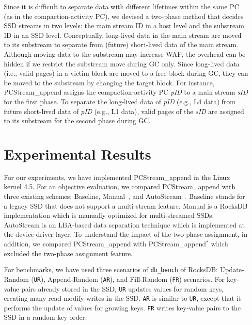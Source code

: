 Since it is difficult to separate data with different lifetimes within the same PC 
(as in the compaction-activity PC), we devised a two-phase method that decides SSD 
streams in two levels: the main stream ID in a host level and the substream ID in an SSD level.
Conceptually, long-lived data in the main stream are moved to its substream to 
separate from (future) short-lived data of the main stream.
Although moving data to the substream may increase WAF,
the overhead can be hidden if we restrict the substream move during GC only.
Since long-lived data (i.e., valid pages) in a victim block are moved to a free block during GC, 
they can be moved to the substream by changing the target block.
For instance, \textsf{\small PCStream\_append} assigns the compaction-activity PC {\it pID} to a
main stream {\it sID} for the first phase.
To separate the long-lived data of {\it pID} (e.g., L4 data) 
from future short-lived data of {\it pID} (e.g., L1 data), 
valid pages of the {\it sID} are assigned to its substream for the second phase during GC.


\section{Experimental Results}

For our experiments, we have implemented \textsf{\small PCStream\_append} in the Linux kernel
4.5.  For an objective evaluation, we compared \textsf{\small PCStream\_append} with three
existing schemes: \textsf{\small Baseline}, \textsf{\small Manual}~\cite{MultiStream}, and
\textsf{\small AutoStream}~\cite{AutoStream}.  \textsf{\small Baseline} stands for a legacy
SSD that does not support a multi-stream feature. \textsf{\small Manual} is a RocksDB
implementation which is manually optimized for multi-streamed SSDs.
\textsf{\small AutoStream} is an LBA-based data separation technique which is
implemented at the device driver layer. To understand the impact of the
two-phase assignment, in addition, we compared \textsf{\small PCStream\_append} with
\textsf{\small PCStream\_append$^{*}$} which excluded the two-phase assignment feature.

For benchmarks, we have used three scenarios of \texttt{db\_bench} of RocksDB:
Update-Random (\texttt{UR}), Append-Random (\texttt{AR}), and Fill-Random
(\texttt{FR}) scenarios.  For key-value pairs already stored in the SSD,
\texttt{UR} updates values for random keys, creating many
read-modify-writes in the SSD.  \texttt{AR} is similar to \texttt{UR}, except
that it performs the update of values for growing keys. \texttt{FR} writes
key-value pairs to the SSD in a random key order.

